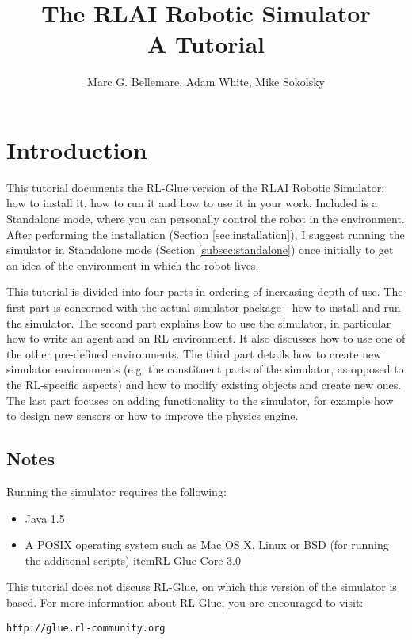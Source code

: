 \documentclass[12pt]{article}
\author{Marc G. Bellemare, Adam White, Mike Sokolsky}
\title{The RLAI Robotic Simulator\\ A Tutorial}
\begin{document}
\maketitle

\section{Introduction}

This tutorial documents the RL-Glue version of the RLAI Robotic Simulator: how 
to install it, how to run it and how to use it in your work. Included is a 
Standalone mode, where you can personally control the robot in the environment.
After performing the installation (Section \ref{sec:installation}),  I suggest 
running the simulator in Standalone mode (Section \ref{subsec:standalone}) 
once initially to get an idea of the environment in which the robot lives.

This tutorial is divided into four parts in ordering of increasing depth of
use. The first part is concerned with the actual simulator package - how
to install and run the simulator. The second part explains how to use the 
simulator, in particular how to write an agent and an RL environment. It
also discusses how to use one of the other pre-defined environments. The
third part details how to create new simulator environments (e.g. the 
constituent parts of the simulator, as opposed to the RL-specific aspects)
and how to modify existing objects and create new ones. The last part focuses
on adding functionality to the simulator, for example how to design new 
sensors or how to improve the physics engine.

\subsection{Notes}

Running the simulator requires the following:

\begin{itemize}
\item{Java 1.5}
\item{A POSIX operating system such as Mac OS X, Linux or BSD (for running the additonal scripts)}
item{RL-Glue Core 3.0}
\end{itemize}

This tutorial does not discuss RL-Glue, on which this version of the simulator
is based. For more information about RL-Glue, you are encouraged to visit:

\begin{verbatim}
http://glue.rl-community.org
\end{verbatim}
\end{document}
